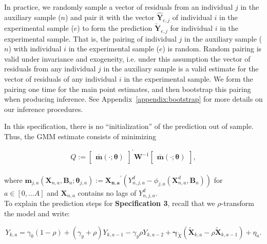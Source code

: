 \begin{enumerate}
\noindent In practice, we randomly sample a vector of residuals from an individual $j$ in the auxiliary sample ($n$) and pair it with the vector $\hat{\bm{Y}}_{e,j}$ of individual $i$ in the experimental sample ($e$) to form the prediction $\tilde{\bm{Y}}_{e,j}$ for individual $i$ in the experimental sample. That is, the pairing of individual $j$ in the auxiliary sample ($n$) with individual $i$ in the experimental sample ($e$) is random. Random pairing is valid under invariance and exogeneity, i.e. under this assumption the vector of residuals from any individual $j$ in the auxiliary sample is a valid estimate for the vector of residuals of any individual $i$ in the experimental sample. We form the pairing one time for the main point estimates, and then bootstrap this pairing when producing inference. See Appendix~\ref{appendix:bootstrap} for more details on our inference procedures.
\end{enumerate}

\noindent In this specification, there is no ``initialization'' of the prediction out of sample. Thus, the GMM estimate consists of minimizing 

\begin{equation}
Q :=  {\begin{bmatrix} {\bm{\bar{m}} \left( \cdot ; \bm{\theta} \right) }  \end{bmatrix}}^{'}
\bm{W} ^{-1}{\begin{bmatrix} {\bm{\bar{m}} \left( \cdot ; \bm{\theta} \right) }   \end{bmatrix}}, \label{eq:wlossspec2}
\end{equation}\\

\noindent where $\bm{m}_{j,a} \left( \bm{X}_{n,a}, \bm{B}_{n} ; \bm{\theta}_{j,a} \right) := {\bm{X_{n,a}}}^{'} \left( Y_{n,j,a}^d -   \phi_{j,a} \left( \bm{X}_{n,a}^d, \bm{B}_{n} \right) \right)$ for $a \in [0, \ldots A]$ and  $\bm{X}_{n,a}$ contains no lags of $Y_{n,j,a}^d$.\\

\noindent  To explain the prediction steps for \textbf{Specification 3}, recall that we $\rho$-transform the model and write: 

\begin{equation}
Y_{k,a} = \gamma_{0} \left( 1 - \rho \right) + \left( \gamma_{y} + \rho \right) Y_{k,a-1} - \gamma_{y} \rho Y_{k,a-2} + \bm{\gamma}_{\tilde{X}} \left( \tilde{\bm{X}}_{k,a}  -  \rho \tilde{\bm{X}}_{k,a-1} \right) + \eta_{a}. \label{eq:rhotransformb}
\end{equation}

